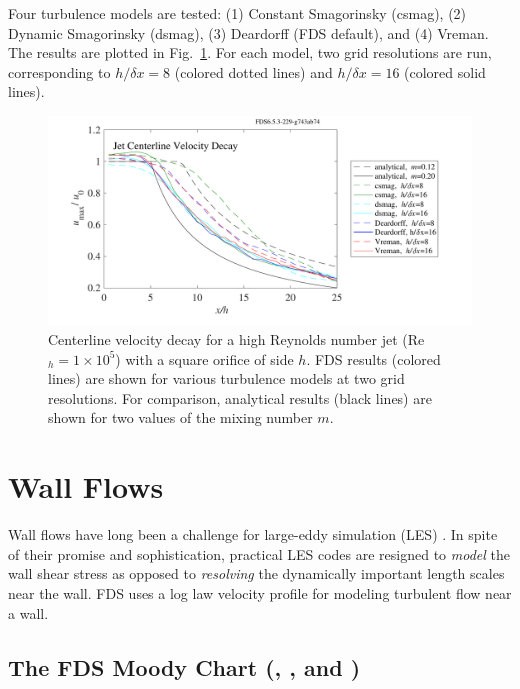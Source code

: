 \documentclass[11pt]{book}
\begin{document}
Four turbulence models are tested: (1) Constant Smagorinsky (csmag), (2) Dynamic Smagorinsky (dsmag), (3) Deardorff (FDS default), and (4) Vreman.  The results are plotted in Fig.~\ref{fig_jet_decay}. For each model, two grid resolutions are run, corresponding to $h/\delta x = 8$ (colored dotted lines) and $h/\delta x=16$ (colored solid lines).
\begin{center}
\begin{figure}[h]
  \includegraphics[width=\textwidth]{SCRIPT_FIGURES/jet_decay}
  \caption[Jet centerline velocity decay]{Centerline velocity decay for a high Reynolds number jet (Re$_h = 1 \times 10^5$) with a square orifice of side $h$.  FDS results (colored lines) are shown for various turbulence models at two grid resolutions.  For comparison, analytical results (black lines) are shown for two values of the mixing number $m$.}
  \label{fig_jet_decay}
\end{figure}
\end{center}

\clearpage

\section{Wall Flows}
\label{fds_wall_flows1}

Wall flows have long been a challenge for large-eddy simulation (LES) \cite{Baggett:1997,Baggett:1998,Cabot:1995,Pope:2000,Sagaut:2001}.  In spite of their promise and sophistication, practical LES codes are resigned to \emph{model} the wall shear stress as opposed to \emph{resolving} the dynamically important length scales near the wall. FDS uses a log law velocity profile \cite{Pope:2000} for modeling turbulent flow near a wall.

\subsection{The FDS Moody Chart (\texorpdfstring{}{poiseuille}, \texorpdfstring{}{smoothwall}, and \texorpdfstring{}{z0})}
\label{fds_moody_chart}
\end{document}
